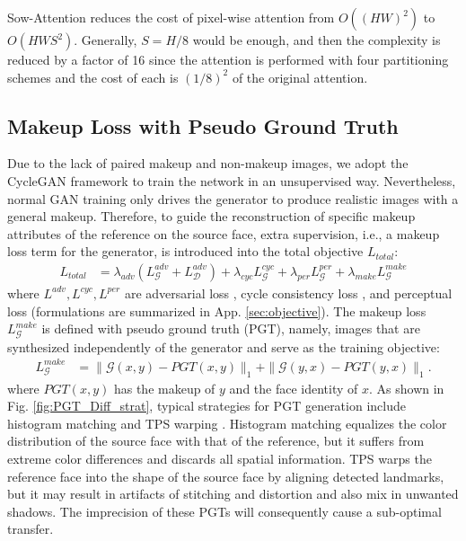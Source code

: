Sow-Attention reduces the cost of pixel-wise attention from $O\left((HW)^2\right)$ to $O\left(HWS^2\right)$. Generally, $S=H/8$ would be enough, and then the complexity is reduced by a factor of 16 since the attention is performed with four partitioning schemes and the cost of each is $(1/8)^2$ of the original attention. 

\subsection{Makeup Loss with Pseudo Ground Truth}
Due to the lack of paired makeup and non-makeup images, we adopt the CycleGAN \cite{CycleGAN} framework to train the network in an unsupervised way. Nevertheless, normal GAN training only drives the generator to produce realistic images with a general makeup. Therefore, to guide the reconstruction of specific makeup attributes of the reference on the source face, extra supervision, i.e., a makeup loss term for the generator, is introduced into the total objective $L_{total}$:
\begin{equation}
\begin{aligned}
    L_{total}&=\lambda_{a d v} (L_{\mathcal{G}}^{a d v} +  L_{\mathcal{D}}^{a d v})+\lambda_{c y c} L_{\mathcal{G}}^{c y c}+\lambda_{per} L_{\mathcal{G}}^{per}+\lambda_{make} L_{\mathcal{G}}^{make}
\end{aligned}
\end{equation}
where $L^{a d v},L^{c y c},L^{per}$ are adversarial loss \cite{GAN}, cycle consistency loss \cite{CycleGAN}, and perceptual loss \cite{PerceptualLoss} (formulations are summarized in App. %
\ref{sec:objective}). 
The makeup loss $L_{\mathcal{G}}^{make}$ is defined with pseudo ground truth (PGT), namely, images that are synthesized independently of the generator and serve as the training objective:
\begin{equation}
\begin{aligned}
L_{\mathcal{G}}^{m a k e} &=\|\mathcal{G}(x, y)-P G T(x, y)\|_{1} +\|\mathcal{G}(y, x)-P G T(y, x)\|_{1} .
\end{aligned}
\end{equation}
where $PGT(x,y)$ has the makeup of $y$ and the face identity of $x$. 
As shown in Fig. \ref{fig:PGT_Diff_strat}, typical strategies for PGT generation include histogram matching \cite{BeautyGAN,PSGAN} and TPS warping \cite{FAT}. Histogram matching equalizes the color distribution of the source face with that of the reference, but it suffers from extreme color differences and discards all spatial information. TPS warps the reference face into the shape of the source face by aligning detected landmarks, but it may result in artifacts of stitching and distortion and also mix in unwanted shadows. The imprecision of these PGTs will consequently cause a sub-optimal transfer. 
